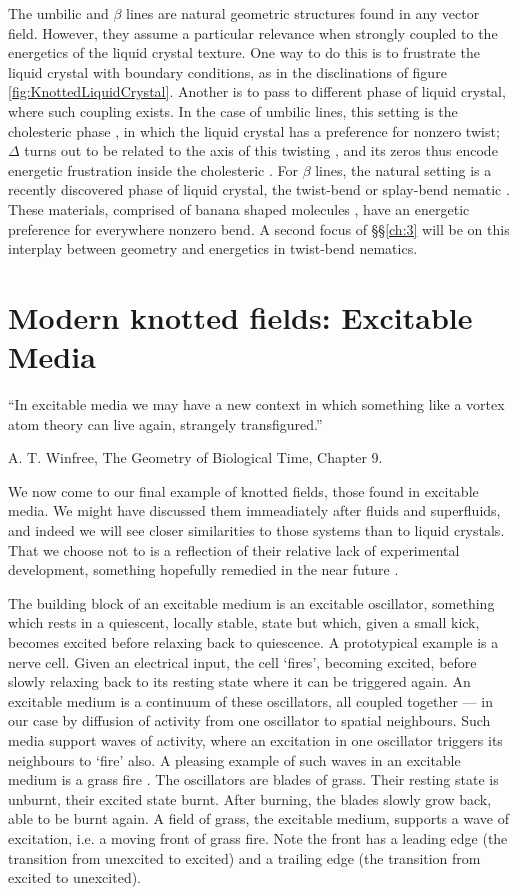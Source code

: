 The umbilic and $\beta$ lines are natural geometric structures found in any vector field. However, they assume a particular relevance when strongly coupled to the energetics of the liquid crystal texture. One way to do this is to frustrate the liquid crystal with boundary conditions, as in the disclinations of figure \ref{fig:KnottedLiquidCrystal}. Another is to pass to different phase of liquid crystal, where such coupling exists. In the case of umbilic lines, this setting is the cholesteric phase \cite{Bellar}, in which the liquid crystal has a preference for nonzero twist; $\Delta$ turns out to be related to the axis of this twisting \cite{GarethBook}, and its zeros thus encode energetic frustration inside the cholesteric \cite{}. For $\beta$ lines, the natural setting is a recently discovered phase of liquid crystal, the twist-bend or splay-bend nematic \cite{}. These materials, comprised of banana shaped molecules \cite{}, have an energetic preference for everywhere nonzero bend. A second focus of \S\S\ref{ch:3} will be on this interplay between geometry and energetics in twist-bend nematics. 

\section{Modern knotted fields: Excitable Media}

\setlength{\epigraphwidth}{5in} 
\epigraph{``In excitable media we may have a new context in which something like a vortex atom theory can live again, strangely transfigured.''}{A. T. Winfree, The Geometry of Biological Time, Chapter 9.}

We now come to our final example of knotted fields, those found in excitable media. We might have discussed them immeadiately after fluids and superfluids, and indeed we will see closer similarities to those systems than to liquid crystals. That we choose not to is a reflection of their relative lack of experimental development, something hopefully remedied in the near future \cite{}. 

The building block of an excitable medium is an excitable oscillator, something which rests in a quiescent, locally stable, state but which, given a small kick, becomes excited before relaxing back to quiescence. A prototypical example is a nerve cell. Given an electrical input, the cell `fires', becoming excited, before slowly relaxing back to its resting state where it can be triggered again. An excitable medium is a continuum of these oscillators, all coupled together --- in our case by diffusion of activity from one oscillator to spatial neighbours. Such media support waves of activity, where an excitation in one oscillator triggers its neighbours to `fire' also. A pleasing example of such waves in an excitable medium is a grass fire \cite{Winfree}. The oscillators are blades of grass. Their resting state is unburnt, their excited state burnt. After burning, the blades slowly grow back, able to be burnt again. A field of grass, the excitable medium, supports a wave of excitation, i.e. a moving  front of grass fire. Note the front has a leading edge (the transition from unexcited to excited) and a trailing edge (the transition from excited to unexcited).

